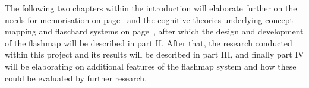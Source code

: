 The following two chapters within the introduction will elaborate further on the needs for memorisation on page~\pageref{ch:context} and the cognitive theories underlying concept mapping and flaschard systems on page~\pageref{ch:theory}, after which the design and development of the flashmap will be described in part II. After that, the research conducted within this project and its results will be described in part III, and finally part IV will be elaborating on additional features of the flashmap system and how these could be evaluated by further research.

